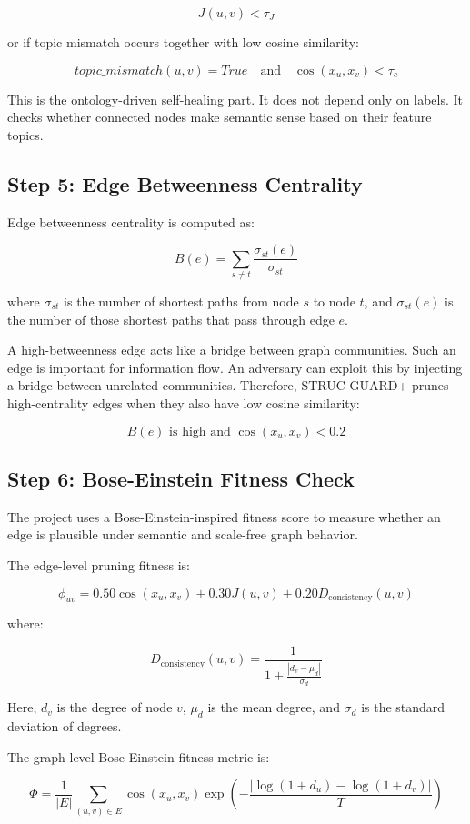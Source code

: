 \documentclass[12pt,a4paper]{article}
\begin{document}
$$
J(u,v)<\tau_J
$$

or if topic mismatch occurs together with low cosine similarity:

$$
topic\_mismatch(u,v)=True \quad \text{and} \quad \cos(x_u,x_v)<\tau_c
$$

This is the ontology-driven self-healing part. It does not depend only on labels. It checks whether connected nodes make semantic sense based on their feature topics.

\subsection{Step 5: Edge Betweenness Centrality}
Edge betweenness centrality is computed as:

$$
B(e)=\sum_{s\neq t}\frac{\sigma_{st}(e)}{\sigma_{st}}
$$

where $\sigma_{st}$ is the number of shortest paths from node $s$ to node $t$, and $\sigma_{st}(e)$ is the number of those shortest paths that pass through edge $e$.

A high-betweenness edge acts like a bridge between graph communities. Such an edge is important for information flow. An adversary can exploit this by injecting a bridge between unrelated communities. Therefore, STRUC-GUARD+ prunes high-centrality edges when they also have low cosine similarity:

$$
B(e)\text{ is high and }\cos(x_u,x_v)<0.2
$$

\subsection{Step 6: Bose-Einstein Fitness Check}
The project uses a Bose-Einstein-inspired fitness score to measure whether an edge is plausible under semantic and scale-free graph behavior.

The edge-level pruning fitness is:

$$
\phi_{uv}=0.50\cos(x_u,x_v)+0.30J(u,v)+0.20D_{\text{consistency}}(u,v)
$$

where:

$$
D_{\text{consistency}}(u,v)=\frac{1}{1+\frac{|d_v-\mu_d|}{\sigma_d}}
$$

Here, $d_v$ is the degree of node $v$, $\mu_d$ is the mean degree, and $\sigma_d$ is the standard deviation of degrees.

The graph-level Bose-Einstein fitness metric is:

$$
\Phi=\frac{1}{|E|}\sum_{(u,v)\in E}\cos(x_u,x_v)\exp\left(-\frac{|\log(1+d_u)-\log(1+d_v)|}{T}\right)
$$
\end{document}
